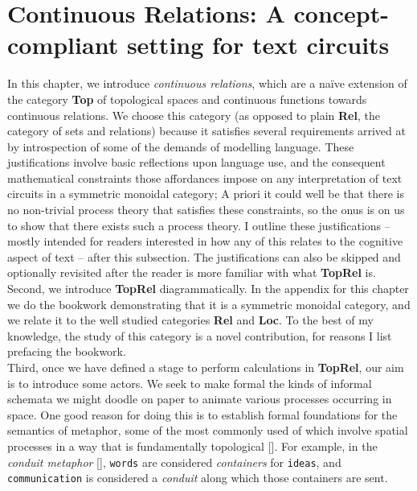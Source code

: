 \section{Continuous Relations: A concept-compliant setting for text circuits}

\begin{fullwidth}

In this chapter, we introduce \emph{continuous relations}, which are a na\"{i}ve extension of the category \textbf{Top} of topological spaces and continuous functions towards continuous relations. We choose this category (as opposed to plain \textbf{Rel}, the category of sets and relations) because it satisfies several requirements arrived at by introspection of some of the demands of modelling language. These justifications involve basic reflections upon language use, and the consequent mathematical constraints those affordances impose on any interpretation of text circuits in a symmetric monoidal category; A priori it could well be that there is no non-trivial process theory that satisfies these constraints, so the onus is on us to show that there exists such a process theory. I outline these justifications -- mostly intended for readers interested in how any of this relates to the cognitive aspect of text -- after this subsection. The justifications can also be skipped and optionally revisited after the reader is more familiar with what \textbf{TopRel} is.\\

Second, we introduce \textbf{TopRel} diagrammatically. In the appendix for this chapter we do the bookwork demonstrating that it is a symmetric monoidal category, and we relate it to the well studied categories \textbf{Rel} and \textbf{Loc}. To the best of my knowledge, the study of this category is a novel contribution, for reasons I list prefacing the bookwork.\\

Third, once we have defined a stage to perform calculations in \textbf{TopRel}, our aim is to introduce some actors. We seek to make formal the kinds of informal schemata we might doodle on paper to animate various processes occurring in space. One good reason for doing this is to establish formal foundations for the semantics of metaphor, some of the most commonly used of which involve spatial processes in a way that is fundamentally topological []. For example, in the \emph{conduit metaphor} [], \texttt{words} are considered \emph{containers} for \texttt{ideas}, and \texttt{communication} is considered a \emph{conduit} along which those containers are sent.


\end{fullwidth}
